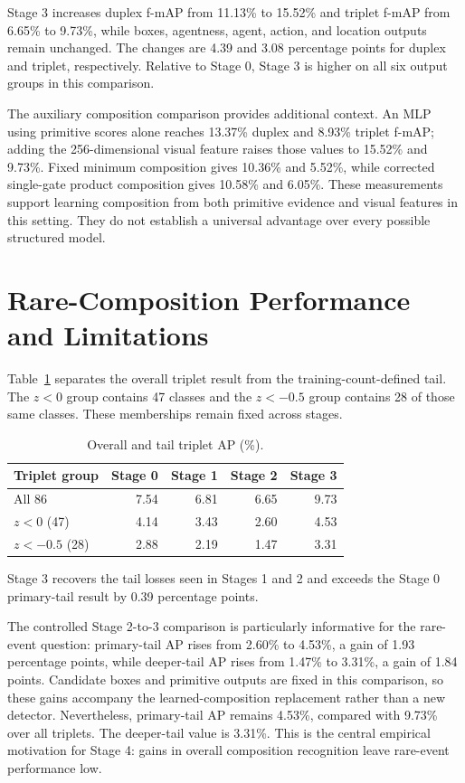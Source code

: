 Stage 3 increases duplex f-mAP from 11.13\% to 15.52\% and triplet f-mAP from 6.65\% to 9.73\%, while boxes, agentness, agent, action, and location outputs remain unchanged. The changes are 4.39 and 3.08 percentage points for duplex and triplet, respectively. Relative to Stage 0, Stage 3 is higher on all six output groups in this comparison.

The auxiliary composition comparison provides additional context. An MLP using primitive scores alone reaches 13.37\% duplex and 8.93\% triplet f-mAP; adding the 256-dimensional visual feature raises those values to 15.52\% and 9.73\%. Fixed minimum composition gives 10.36\% and 5.52\%, while corrected single-gate product composition gives 10.58\% and 6.05\%. These measurements support learning composition from both primitive evidence and visual features in this setting. They do not establish a universal advantage over every possible structured model.

\section{Rare-Composition Performance and Limitations}

Table~\ref{tab:4} separates the overall triplet result from the training-count-defined tail. The \(z < 0\) group contains 47 classes and the \(z < -0.5\) group contains 28 of those same classes. These memberships remain fixed across stages.

\begin{table}[htbp]
\centering
\caption{Overall and tail triplet AP (\%).}
\label{tab:4}
\begin{singlespace}
\begin{tabular}{@{}lrrrr@{}}
\toprule
\textbf{Triplet group} & \textbf{Stage 0} & \textbf{Stage 1} & \textbf{Stage 2} & \textbf{Stage 3} \\
\midrule
All 86 & 7.54 & 6.81 & 6.65 & 9.73 \\
\(z < 0\) (47) & 4.14 & 3.43 & 2.60 & 4.53 \\
\(z < -0.5\) (28) & 2.88 & 2.19 & 1.47 & 3.31 \\
\bottomrule
\end{tabular}
\end{singlespace}
\end{table}

Stage 3 recovers the tail losses seen in Stages 1 and 2 and exceeds the Stage 0 primary-tail result by 0.39 percentage points.

The controlled Stage 2-to-3 comparison is particularly informative for the rare-event question: primary-tail AP rises from 2.60\% to 4.53\%, a gain of 1.93 percentage points, while deeper-tail AP rises from 1.47\% to 3.31\%, a gain of 1.84 points. Candidate boxes and primitive outputs are fixed in this comparison, so these gains accompany the learned-composition replacement rather than a new detector. Nevertheless, primary-tail AP remains 4.53\%, compared with 9.73\% over all triplets. The deeper-tail value is 3.31\%. This is the central empirical motivation for Stage 4: gains in overall composition recognition leave rare-event performance low.


